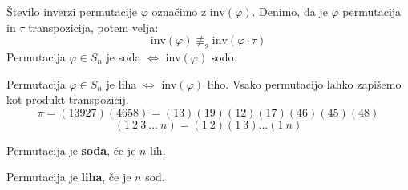 \documentclass[10pt,landscape]{article}
\begin{document}
\begin{multicols}{3}
Število inverzi permutacije $\varphi$ označimo z $\textrm{inv}(\varphi)$.
\bigbreak
Denimo, da je $\varphi$ permutacija in $\tau$ transpozicija, potem velja:
\[\textrm{inv}(\varphi) \not\equiv_2 \textrm{inv}(\varphi \cdot \tau)\]
\bigbreak
Permutacija $\varphi \in S_n$ je soda $\Leftrightarrow$ $\textrm{inv}(\varphi)$ sodo.

Permutacija $\varphi \in S_n$ je liha $\Leftrightarrow$ $\textrm{inv}(\varphi)$ liho.
\bigbreak
Vsako permutacijo lahko zapišemo kot produkt transpozicij.
\[\pi = (13927)(4658) = (13)(19)(12)(17)(46)(45)(48)\]
\[(1\ 2\ 3\ ...\ n) = (1\ 2)(1\ 3)...(1\ n)\]

Permutacija je \textbf{soda}, če je $n$ lih.

Permutacija je \textbf{liha}, če je $n$ sod.
\end{multicols}
\end{document}
